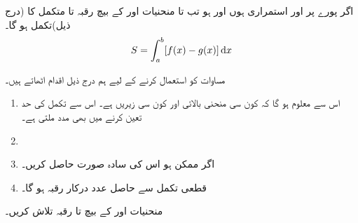 اگر پورے  پر  اور  استمراری ہوں اور  ہو تب  تا  منحنیات  اور  کے بیچ رقبہ  تا  متکمل  کا  (درج ذیل)تکمل ہو گا۔
\begin{align}\label{مساوات_تکمل_استعمال_رقبہ_تعریف}
S=\int_a^b[f(x)-g(x)]\dif x
\end{align}  

مساوات  کو استعمال کرنے کے لیے ہم درج ذیل اقدام اٹھاتے ہیں۔

\begin{enumerate}[1.]
\item
{} اس سے معلوم ہو گا کہ کون سی منحنی بالائی  اور کون سی زیریں  ہے۔ اس سے تکمل کی حد تعین کرنے میں بھی مدد ملتی ہے۔
\item
{}
\item
{} اگر ممکن ہو اس کی سادہ صورت حاصل کریں۔
\item
{} قطعی تکمل سے حاصل عدد  درکار رقبہ ہو گا۔
\end{enumerate}

منحنیات  اور  کے بیچ  تا  رقبہ تلاش کریں۔

